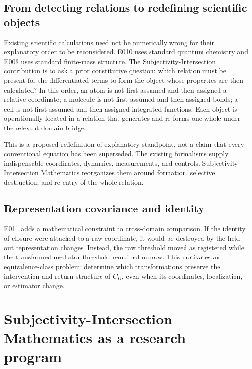 \documentclass[11pt,a4paper]{article}
\begin{document}
\subsection{From detecting relations to redefining scientific objects}

Existing scientific calculations need not be numerically wrong for their explanatory order to be reconsidered. E010 uses standard quantum chemistry and E008 uses standard finite-mass structure. The Subjectivity-Intersection contribution is to ask a prior constitutive question: which relation must be present for the differentiated terms to form the object whose properties are then calculated? In this order, an atom is not first assumed and then assigned a relative coordinate; a molecule is not first assumed and then assigned bonds; a cell is not first assumed and then assigned integrated functions. Each object is operationally located in a relation that generates and re-forms one whole under the relevant domain bridge.

This is a proposed redefinition of explanatory standpoint, not a claim that every conventional equation has been superseded. The existing formalisms supply indispensable coordinates, dynamics, measurements, and controls. Subjectivity-Intersection Mathematics reorganizes them around formation, selective destruction, and re-entry of the whole relation.

\subsection{Representation covariance and identity}

E011 adds a mathematical constraint to cross-domain comparison. If the identity of closure were attached to a raw coordinate, it would be destroyed by the held-out representation changes. Instead, the raw threshold moved as registered while the transformed mediator threshold remained narrow. This motivates an equivalence-class problem: determine which transformations preserve the intervention and return structure of $C_D$, even when its coordinates, localization, or estimator change.

\section{Subjectivity-Intersection Mathematics as a research program}
\end{document}

